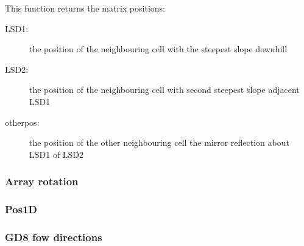 
This function returns the matrix positions:

\vspace{-2mm}
\begin{description}
\item [{LSD1:}] the position of the neighbouring cell with the steepest
slope downhill
\item [{LSD2:}] the position of the neighbouring cell with second steepest
slope adjacent LSD1
\item [{otherpos:}] the position of the other neighbouring cell the mirror
reflection about LSD1 of LSD2
\end{description}


\begin{usessubs}
\end{usessubs}

\subsubsection{Array rotation}



\subsubsection{Pos1D}



\subsubsection{GD8 fow directions}



